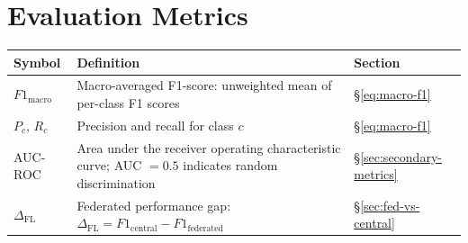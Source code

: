 \section*{Evaluation Metrics}
\begin{center}
\renewcommand{\arraystretch}{1.4}
\begin{tabular}{p{2.8cm} p{9.5cm} p{1.6cm}}
  \hline
  \textbf{Symbol} & \textbf{Definition} & \textbf{Section} \\
  \hline
  $F1_{\mathrm{macro}}$
    & Macro-averaged F1-score: unweighted mean of
      per-class F1 scores
    & §\ref{eq:macro-f1} \\
  $P_c$, $R_c$
    & Precision and recall for class $c$
    & §\ref{eq:macro-f1} \\
  AUC-ROC
    & Area under the receiver operating characteristic
      curve; AUC $= 0.5$ indicates random discrimination
    & §\ref{sec:secondary-metrics} \\
  $\Delta_{\mathrm{FL}}$
    & Federated performance gap:
      $\Delta_{\mathrm{FL}} = F1_{\mathrm{central}}
      - F1_{\mathrm{federated}}$
    & §\ref{sec:fed-vs-central} \\
  \hline
\end{tabular}
\end{center}
